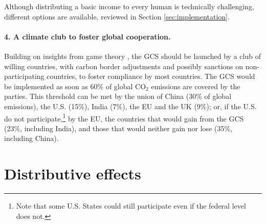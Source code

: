 \documentclass[12pt,english]{article}
\begin{document}
Although distributing a basic income to every human is technically challenging, different options are available, reviewed in Section \ref{sec:implementation}. 

\paragraph*{4. A climate club to foster global cooperation.}

Building on insights from game theory \citep{mackay_price_2015, nordhaus_climate_2015}, the GCS should be launched by a club of willing countries, with carbon border adjustments and possibly sanctions on non-participating countries, to foster compliance by most countries. 
The GCS would be implemented as soon as 60\% of global CO$_\text{2}$ emissions are covered by the parties. This threshold can be met by the union of China (30\% of global emissions), the U.S. (15\%), India (7\%), the EU and the UK (9\%); or, if the U.S. do not participate,\footnote{Note that some U.S. States could still participate even if the federal level does not.} by the EU, the countries that would gain from the GCS (23\%, including India), and those that would neither gain nor lose (35\%, including China).

% 



\section{Distributive effects}\label{sec:distribution}
\end{document}
